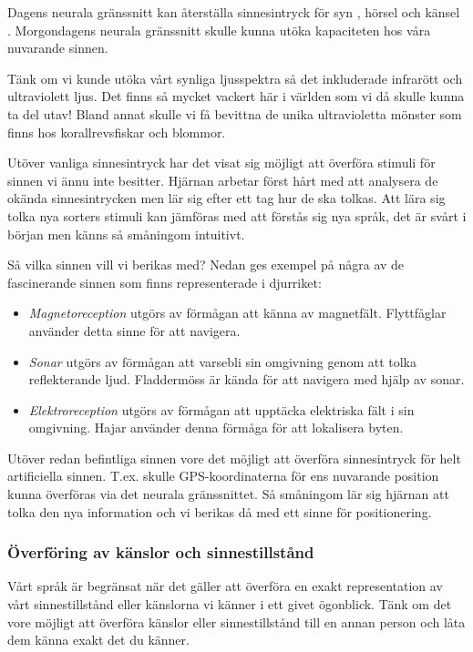 \documentclass[12pt, a4paper]{article}
\begin{document}
Dagens neurala gränssnitt kan återställa sinnesintryck för syn \cite{sight1},
hörsel \cite{sound} och känsel \cite{touch}. Morgondagens neurala gränssnitt
skulle kunna utöka kapaciteten hos våra nuvarande sinnen.

Tänk om vi kunde utöka vårt synliga ljusspektra så det inkluderade infrarött och
ultraviolett ljus. Det finns så mycket vackert här i världen som vi då skulle
kunna ta del utav! Bland annat skulle vi få bevittna de unika ultravioletta
mönster som finns hos korallrevsfiskar \cite{uv_patterns} och blommor.

Utöver vanliga sinnesintryck har det visat sig möjligt att överföra stimuli för
sinnen vi ännu inte besitter. Hjärnan arbetar först hårt med att analysera de
okända sinnesintrycken men lär sig efter ett tag hur de ska tolkas. Att lära sig
tolka nya sorters stimuli kan jämföras med att förstås sig nya språk, det är
svårt i början men känns så småningom intuitivt. \cite{learn_sense}

Så vilka sinnen vill vi berikas med? Nedan ges exempel på några av de
fascinerande sinnen som finns representerade i djurriket:

\begin{itemize}
	\item \textit{Magnetoreception} utgörs av förmågan att känna av magnetfält.
	Flyttfåglar använder detta sinne för att navigera.
	\item \textit{Sonar} utgörs av förmågan att varsebli sin omgivning genom att
	tolka reflekterande ljud. Fladdermöss är kända för att navigera med hjälp av
	sonar.
	\item \textit{Elektroreception} utgörs av förmågan att upptäcka elektriska
	fält i sin omgivning. Hajar använder denna förmåga för att lokalisera byten.
\end{itemize}

Utöver redan befintliga sinnen vore det möjligt att överföra sinnesintryck för
helt artificiella sinnen. T.ex. skulle GPS-koordinaterna för ens nuvarande
position kunna överföras via det neurala gränssnittet. Så småningom lär sig
hjärnan att tolka den nya information och vi berikas då med ett sinne för
positionering.

\subsubsection{Överföring av känslor och sinnestillstånd}

Vårt språk är begränsat när det gäller att överföra en exakt representation av
vårt sinnestillstånd eller känslorna vi känner i ett givet ögonblick. Tänk om
det vore möjligt att överföra känslor eller sinnestillstånd till en annan person
och låta dem känna exakt det du känner.
\end{document}
